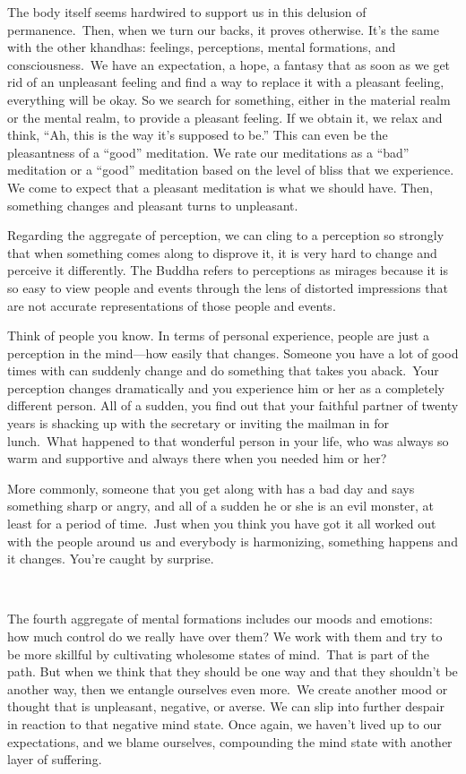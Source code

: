 The body itself seems hardwired to support us in this delusion of permanence.~Then, when we turn our backs, it proves otherwise. It's the same with the other khandhas: feelings, perceptions, mental formations, and consciousness.~We have an expectation, a hope, a fantasy that as soon as we get rid of an unpleasant feeling and find a way to replace it with a pleasant feeling, everything will be okay. So we search for something, either in the material realm or the mental realm, to provide a pleasant feeling. If we obtain it, we relax and think, ``Ah, this is the way it's supposed to be.'' This can even be the pleasantness of a ``good'' meditation. We rate our meditations as a ``bad'' meditation or a ``good'' meditation based on the level of bliss that we experience. We come to expect that a pleasant meditation is what we should have. Then, something changes and pleasant turns to unpleasant.

Regarding the aggregate of perception, we can cling to a perception so strongly that when something comes along to disprove it, it is very hard to change and perceive it differently. The Buddha refers to perceptions as mirages because it is so easy to view people and events through the lens of distorted impressions that are not accurate representations of those people and events.~

Think of people you know. In terms of personal experience, people are just a perception in the mind---how easily that changes. Someone you have a lot of good times with can suddenly change and do something that takes you aback.~Your perception changes dramatically and you experience him or her as a completely different person. All of a sudden, you find out that your faithful partner of twenty years is shacking up with the secretary or inviting the mailman in for lunch.~What happened to that wonderful person in your life, who was always so warm and supportive and always there when you needed him or her?

More commonly, someone that you get along with has a bad day and says something sharp or angry, and all of a sudden he or she is an evil monster, at least for a period of time.~Just when you think you have got it all worked out with the people around us and everybody is harmonizing, something happens and it changes. You're caught by surprise.~~

~

The fourth aggregate of mental formations includes our moods and emotions: how much control do we really have over them? We work with them and try to be more skillful by cultivating wholesome states of mind.~That is part of the path. But when we think that they should be one way and that they shouldn't be another way, then we entangle ourselves even more.~We create another mood or thought that is unpleasant, negative, or averse. We can slip into further despair in reaction to that negative mind state. Once again, we haven't lived up to our expectations, and we blame ourselves, compounding the mind state with another layer of suffering.~

